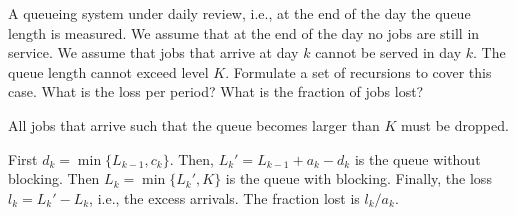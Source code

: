 \begin{exercise} 
A queueing system
 under daily review, i.e., at the end of the day the queue length is
 measured. We assume that at the end of the day no jobs are still in
 service. We assume that jobs that arrive at day $k$ cannot be served
 in day $k$. The queue length cannot exceed level $K$. Formulate a
 set of recursions to cover this case. What is the loss per period? What is the fraction of jobs lost?
\begin{solution}
 All jobs that arrive such that the queue becomes larger than $K$ must be dropped.

First $d_k = \min\{L_{k-1}, c_k\}$. Then, $L_k' = L_{k-1}+a_k-d_k$ is the queue without blocking. Then $L_k=\min\{L_k', K\}$ is the queue with blocking. Finally, the loss $l_k=L_k'-L_k$, i.e., the excess arrivals. The fraction lost is $l_k/a_k$. 
\end{solution}
\end{exercise}

